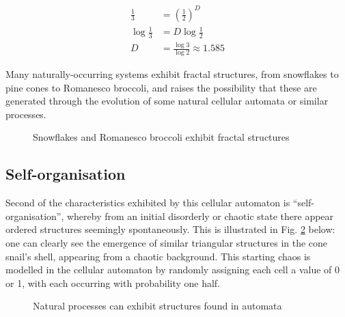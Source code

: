 \documentclass[11pt,a4paper]{article}
\begin{document}
    \begin{equation}
        \label{sierpinskiDim}
        \begin{split}
            \tfrac{1}{3} &= (\tfrac{1}{2})^D \\
            \log{\tfrac{1}{3}} &= D \log{\tfrac{1}{2}} \\
            D &= \tfrac{\log{3}}{\log{2}} \approx 1.585
        \end{split}
    \end{equation}

    Many naturally-occurring systems exhibit fractal structures, from snowflakes
    to pine cones to Romanesco broccoli, and raises the possibility that these
    are generated through the evolution of some natural cellular automata or
    similar processes.

    \begin{figure}[h]%
        \centering
        \qquad
        \caption{Snowflakes and Romanesco broccoli exhibit fractal structures}%
        \label{fig:nature_fractals}%
    \end{figure}

    \subsection{Self-organisation}
    Second of the characteristics exhibited by this cellular automaton is
    ``self-organisation'', whereby from an initial disorderly or chaotic state
    there appear ordered structures seemingly spontaneously. This is illustrated
    in Fig. \ref{fig:self-organisation} below: one can clearly see the emergence
    of similar triangular structures in the cone snail's shell, appearing from a
    chaotic background. This starting chaos is modelled in the cellular
    automaton by randomly assigning each cell a value of 0 or 1, with each
    occurring with probability one half.

    \begin{figure}[h]%
        \centering
        \qquad
        \caption{Natural processes can exhibit structures found in automata}
        \label{fig:self-organisation}
    \end{figure}
\end{document}
